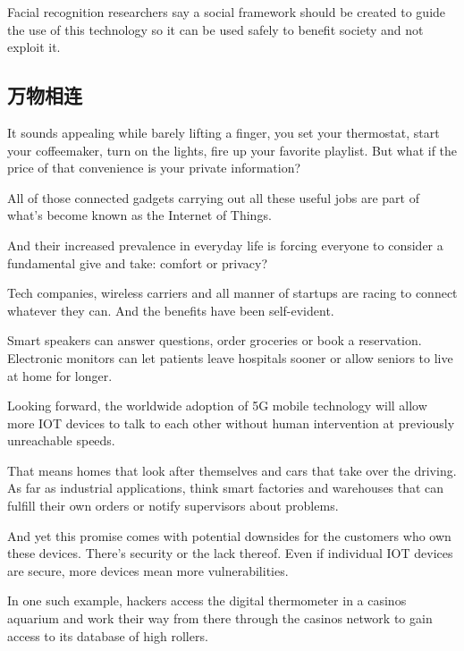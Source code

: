 Facial recognition researchers say a social framework should be created to guide the use of this technology so it can be used safely to benefit society and not exploit it.


\subsection{万物相连}
\begin{margintable}\vspace{-2cm}\footnotesize
\end{margintable}
It sounds appealing while barely lifting a finger, you set your thermostat, start your coffeemaker, turn on the lights, fire up your favorite playlist. But what if the price of that convenience is your private information?

All of those connected gadgets carrying out all these useful jobs are part of what's become known as the Internet of Things.

And their increased prevalence in everyday life is forcing everyone to consider a fundamental give and take: comfort or privacy?

Tech companies, wireless carriers and all manner of startups are racing to connect whatever they can. And the benefits have been self-evident.

Smart speakers can answer questions, order groceries or book a reservation. Electronic monitors can let patients leave hospitals sooner or allow seniors to live at home for longer.

Looking forward, the worldwide adoption of 5G mobile technology will allow more IOT devices to talk to each other without human intervention at previously unreachable speeds.

That means homes that look after themselves and cars that take over the driving. As far as industrial applications, think smart factories and warehouses that can fulfill their own orders or notify supervisors about problems.

And yet this promise comes with potential downsides for the customers who own these devices. There's security or the lack thereof. Even if individual IOT devices are secure, more devices mean more vulnerabilities.

In one such example, hackers access the digital thermometer in a casinos aquarium and work their way from there through the casinos network to gain access to its database of high rollers.

